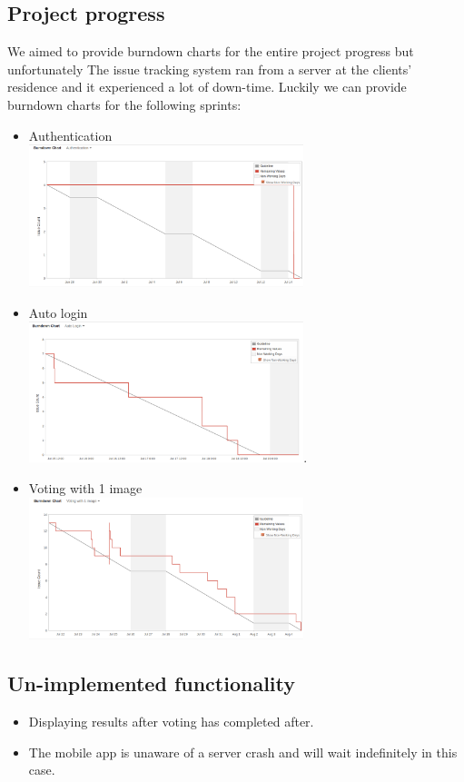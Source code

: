 \documentclass[10pt,a4paper]{article}
\begin{document}
\subsection{Project progress}
We aimed to provide burndown charts for the entire project progress but unfortunately The issue tracking system ran from a server at the clients' residence and it experienced a lot of down-time. Luckily we can provide burndown charts for the following sprints:
\begin{itemize}
\item Authentication\\
\includegraphics[width=80mm]{Pictures/Auth.png}
\item Auto login\\
\includegraphics[width=80mm]{Pictures/ALchart.png}.
\item Voting with 1 image\\
\includegraphics[width=80mm]{Pictures/v1i.png}
\end{itemize}
\subsection{Un-implemented functionality}
\begin{itemize}
\item Displaying results after voting has completed after.
\item The mobile app is unaware of a server crash and will wait indefinitely in this case.
\end{itemize}
\end{document}
